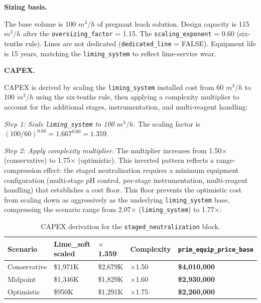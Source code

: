 \medskip
\noindent\textbf{Sizing basis.}\quad

The base volume is 100 $\si{m^3/h}$ of pregnant leach solution. Design capacity is 115 $\si{m^3/h}$ after the \texttt{oversizing\_factor} = 1.15. The \texttt{scaling\_exponent} = 0.60 (six-tenths rule). Lines are not dedicated (\texttt{dedicated\_line} = FALSE). Equipment life is 15 years, matching the \texttt{liming\_system} to reflect lime-service wear.


\medskip
\noindent\textbf{CAPEX.}\quad

CAPEX is derived by scaling the \texttt{liming\_system} installed cost from 60 $\si{m^3/h}$ to 100 $\si{m^3/h}$ using the six-tenths rule, then applying a complexity multiplier to account for the additional stages, instrumentation, and multi-reagent handling:

\textit{Step 1: Scale \texttt{liming\_system} to 100 $\si{m^3/h}$.} The scaling factor is $(100/60)^{0.60} = 1.667^{0.60} = 1.359$.

\textit{Step 2: Apply complexity multiplier.} The multiplier increases from 1.50$\times$ (conservative) to 1.75$\times$ (optimistic). This inverted pattern reflects a range-compression effect: the staged neutralization requires a minimum equipment configuration (multi-stage pH control, per-stage instrumentation, multi-reagent handling) that establishes a cost floor. This floor prevents the optimistic cost from scaling down as aggressively as the underlying \texttt{liming\_system} base, compressing the scenario range from 2.07$\times$ (\texttt{liming\_system}) to 1.77$\times$:

\begin{table}[h!]
\caption{CAPEX derivation for the \texttt{staged\_neutralization} block.}
\centering
\begin{tabular}{>{\raggedright\arraybackslash}p{2.2cm}
				>{\raggedright\arraybackslash}p{2.5cm}
				>{\raggedright\arraybackslash}p{2.0cm}
				>{\raggedright\arraybackslash}p{2.2cm}
				>{\raggedright\arraybackslash}p{3.5cm}}
\toprule
\textbf{Scenario} & \textbf{Lime\_soft scaled} & \textbf{$\times$ 1.359} & \textbf{Complexity} & \texttt{prim\_equip\_price\_base} \\
\midrule
Conservative & \$1,971K & \$2,679K & $\times$1.50 & \textbf{\$4,010,000} \\
Midpoint     & \$1,346K & \$1,829K & $\times$1.60 & \textbf{\$2,930,000} \\
Optimistic   & \$950K   & \$1,291K & $\times$1.75 & \textbf{\$2,260,000} \\
\bottomrule
\end{tabular}
\end{table}


